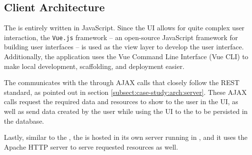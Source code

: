 \subsection{Client Architecture} \label{subsect:case-study:arch:client}

The \mlblinkui is entirely written in JavaScript. Since the UI allows for quite complex user interaction, the \texttt{Vue.js} framework \cite{software:vue} -- an open-source JavaScript framework for building user interfaces -- is used as the view layer to develop the user interface. Additionally, the application uses the Vue Command Line Interface (Vue CLI) to make local development, scaffolding, and deployment easier. \newline

The \mlblinkui communicates with the \mlblinkapi through AJAX calls that closely follow the REST standard, as pointed out in section \ref{subsect:case-study:arch:server}. These AJAX calls request the required data and resources to show to the user in the UI, as well as send data created by the user while using the UI to the \mlblinkapi to be persisted in the database. \newline

Lastly, similar to the \mlblinkapi, the \mlblinkui is hosted in its own server running in \ubuntu, and it uses the Apache HTTP server to serve requested resources as well.
